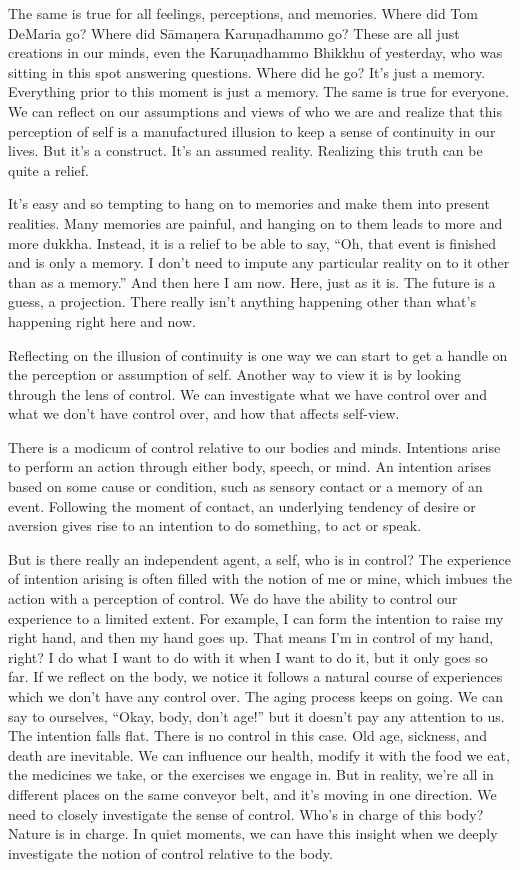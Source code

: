 The same is true for all feelings, perceptions, and memories. Where did Tom DeMaria go? Where did Sāmaṇera Karuṇadhammo go? These are all just creations in our minds, even the Karuṇadhammo Bhikkhu of yesterday, who was sitting in this spot answering questions. Where did he go? It's just a memory. Everything prior to this moment is just a memory. The same is true for everyone. We can reflect on our assumptions and views of who we are and realize that this perception of self is a manufactured illusion to keep a sense of continuity in our lives. But it's a construct. It's an assumed reality. Realizing this truth can be quite a relief.

It's easy and so tempting to hang on to memories and make them into present realities. Many memories are painful, and hanging on to them leads to more and more dukkha. Instead, it is a relief to be able to say, ``Oh, that event is finished and is only a memory. I don't need to impute any particular reality on to it other than as a memory.'' And then here I am now. Here, just as it is. The future is a guess, a projection. There really isn't anything happening other than what's happening right here and now.

Reflecting on the illusion of continuity is one way we can start to get a handle on the perception or assumption of self. Another way to view it is by looking through the lens of control. We can investigate what we have control over and what we don't have control over, and how that affects self-view.

There is a modicum of control relative to our bodies and minds. Intentions arise to perform an action through either body, speech, or mind. An intention arises based on some cause or condition, such as sensory contact or a memory of an event. Following the moment of contact, an underlying tendency of desire or aversion gives rise to an intention to do something, to act or speak.

But is there really an independent agent, a self, who is in control? The experience of intention arising is often filled with the notion of me or mine, which imbues the action with a perception of control. We do have the ability to control our experience to a limited extent. For example, I can form the intention to raise my right hand, and then my hand goes up. That means I'm in control of my hand, right? I do what I want to do with it when I want to do it, but it only goes so far. If we reflect on the body, we notice it follows a natural course of experiences which we don't have any control over. The aging process keeps on going. We can say to ourselves, ``Okay, body, don't age!'' but it doesn't pay any attention to us. The intention falls flat. There is no control in this case. Old age, sickness, and death are inevitable. We can influence our health, modify it with the food we eat, the medicines we take, or the exercises we engage in. But in reality, we're all in different places on the same conveyor belt, and it's moving in one direction. We need to closely investigate the sense of control. Who's in charge of this body? Nature is in charge. In quiet moments, we can have this insight when we deeply investigate the notion of control relative to the body.

